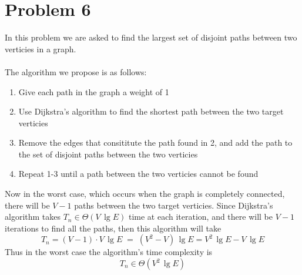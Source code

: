 \section*{Problem 6}

In this problem we are asked to find the largest set of disjoint paths
between two verticies in a graph.
\\
\\
The algorithm we propose is as follows:

\begin{enumerate}[noitemsep]
    \item Give each path in the graph a weight of 1
    \item Use Dijkstra's algorithm to find the shortest path between 
          the two target verticies
    \item Remove the edges that consititute the path found in 2, and 
          add the path to the set of disjoint paths between the two 
          verticies
    \item Repeat 1-3 until a path between the two verticies cannot be
          found
\end{enumerate}
%
Now in the worst case, which occurs when the graph is completely 
connected, there will be $V - 1$ paths between the two target verticies.
Since Dijkstra's algorithm takes $T_n \in \Theta(V \, \lg E)$ time at 
each iteration, and there will be $V - 1$ iterations to find all the
paths, then this algorithm will take
$$
T_n = (V - 1) \cdot V \, \lg E \; = \; (V^2 - V) \, \lg E = 
V^2 \, \lg E - V \, \lg E
$$ 
Thus in the worst case the algorithm's time complexity is 
$$T_n \in \Theta(V^2 \, \lg E)$$
